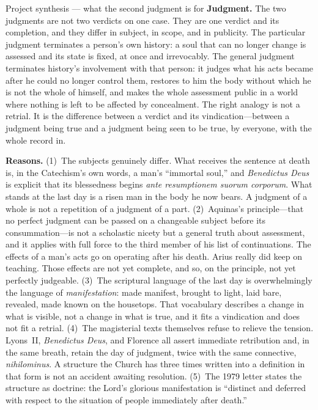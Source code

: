 \begin{studybox}{Project synthesis --- what the second judgment is for}
\textbf{Judgment.} The two judgments are not two verdicts on one case. They are one verdict and its completion, and they differ in subject, in scope, and in publicity. The particular judgment terminates a person's own history: a soul that can no longer change is assessed and its state is fixed, at once and irrevocably. The general judgment terminates history's involvement with that person: it judges what his acts became after he could no longer control them, restores to him the body without which he is not the whole of himself, and makes the whole assessment public in a world where nothing is left to be affected by concealment. The right analogy is not a retrial. It is the difference between a verdict and its vindication---between a judgment being true and a judgment being seen to be true, by everyone, with the whole record in.

\textbf{Reasons.} (1)~The subjects genuinely differ. What receives the sentence at death is, in the Catechism's own words, a man's ``immortal soul,'' and \emph{Benedictus Deus} is explicit that its blessedness begins \emph{ante resumptionem suorum corporum}. What stands at the last day is a risen man in the body he now bears. A judgment of a whole is not a repetition of a judgment of a part. (2)~Aquinas's principle---that no perfect judgment can be passed on a changeable subject before its consummation---is not a scholastic nicety but a general truth about assessment, and it applies with full force to the third member of his list of continuations. The effects of a man's acts go on operating after his death. Arius really did keep on teaching. Those effects are not yet complete, and so, on the principle, not yet perfectly judgeable. (3)~The scriptural language of the last day is overwhelmingly the language of \emph{manifestation}: made manifest, brought to light, laid bare, revealed, made known on the housetops. That vocabulary describes a change in what is visible, not a change in what is true, and it fits a vindication and does not fit a retrial. (4)~The magisterial texts themselves refuse to relieve the tension. Lyons~II, \emph{Benedictus Deus}, and Florence all assert immediate retribution and, in the same breath, retain the day of judgment, twice with the same connective, \emph{nihilominus}. A structure the Church has three times written into a definition in that form is not an accident awaiting resolution. (5)~The 1979 letter states the structure as doctrine: the Lord's glorious manifestation is ``distinct and deferred with respect to the situation of people immediately after death.''


\end{studybox}
